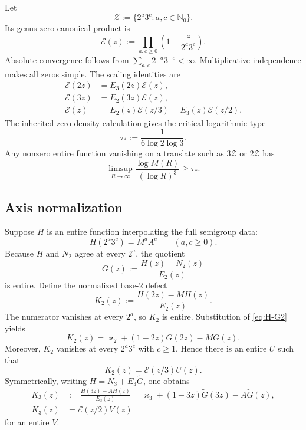 \documentclass[11pt]{article}
\theoremstyle{definition}
\newcommand{\Zgrid}{\mathscr{Z}}
\newcommand{\EE}{\mathcal{E}}
\newcommand{\kk}{\varkappa}
\newcommand{\N}{\mathbb{N}}
\begin{document}
Let
\[
 \Zgrid:=\{2^a3^c:a,c\in\N_0\}.
\]
Its genus-zero canonical product is
\begin{equation}\label{eq:2d-product}
 \EE(z):=\prod_{a,c\ge0}\left(1-\frac{z}{2^a3^c}\right).
\end{equation}
Absolute convergence follows from $\sum_{a,c}2^{-a}3^{-c}<\infty$.  Multiplicative independence makes all zeros simple.  The scaling identities are
\begin{align}
 \EE(2z)&=E_3(2z)\EE(z),\label{eq:EE2}\\
 \EE(3z)&=E_2(3z)\EE(z),\label{eq:EE3}\\
 \EE(z)&=E_2(z)\EE(z/3)=E_3(z)\EE(z/2).
 \label{eq:EE-split}
\end{align}
The inherited zero-density calculation gives the critical logarithmic type
\begin{equation}\label{eq:tau-star}
 \tau_*:=\frac1{6\log2\log3}.
\end{equation}
Any nonzero entire function vanishing on a translate such as $3\Zgrid$ or $2\Zgrid$ has
\begin{equation}\label{eq:jensen-threshold}
 \limsup_{R\to\infty}
 \frac{\log M(R)}{(\log R)^3}\ge\tau_*.
\end{equation}

\subsection{Axis normalization}

Suppose $H$ is an entire function interpolating the full semigroup data:
\begin{equation}\label{eq:H-interpolation}
 H(2^a3^c)=M^aA^c\qquad(a,c\ge0).
\end{equation}
Because $H$ and $N_2$ agree at every $2^a$, the quotient
\begin{equation}\label{eq:H-G2}
 G(z):=\frac{H(z)-N_2(z)}{E_2(z)}
\end{equation}
is entire.  Define the normalized base-$2$ defect
\begin{equation}\label{eq:K2-def}
 K_2(z):=\frac{H(2z)-MH(z)}{E_2(z)}.
\end{equation}
The numerator vanishes at every $2^a$, so $K_2$ is entire.  Substitution of \eqref{eq:H-G2} yields
\begin{equation}\label{eq:K2-qgauge}
 \boxed{\displaystyle
 K_2(z)=\kk_2+(1-2z)G(2z)-MG(z).}
\end{equation}
Moreover, $K_2$ vanishes at every $2^a3^c$ with $c\ge1$.  Hence there is an entire $U$ such that
\begin{equation}\label{eq:K2-export}
 K_2(z)=\EE(z/3)U(z).
\end{equation}
Symmetrically, writing $H=N_3+E_3\widetilde G$, one obtains
\begin{align}
 K_3(z)&:=\frac{H(3z)-AH(z)}{E_3(z)}
 =\kk_3+(1-3z)\widetilde G(3z)-A\widetilde G(z),
 \label{eq:K3-qgauge}\\
 K_3(z)&=\EE(z/2)V(z)
 \label{eq:K3-export}
\end{align}
for an entire $V$.
\end{document}
